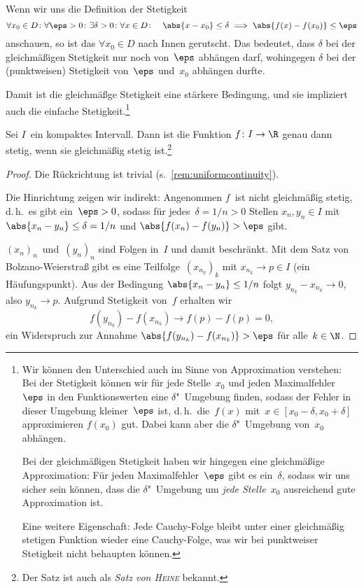 \documentclass[a4paper]{article}
\begin{document}
\begin{remark}\label{rem:uniformcontinuity}
    Wenn wir uns die Definition der Stetigkeit
    \begin{equation*}
        \forall x_0 \in D\colon \forall \eps > 0\colon \exists \delta > 0\colon \forall x \in D\colon\quad \abs{x-x_0} \leq \delta \implies \abs{f(x)-f(x_0)} \leq \eps
    \end{equation*}
    anschauen, so ist das $\forall x_0 \in D$ nach Innen gerutscht. Das bedeutet, dass $\delta$ bei der gleichmäßigen Stetigkeit nur noch von~$\eps$ abhängen darf, wohingegen $\delta$ bei der (punktweisen) Stetigkeit von~$\eps$ und~$x_0$ abhängen durfte.

    Damit ist die gleichmäßge Stetigkeit eine stärkere Bedingung, und sie impliziert auch die einfache Stetigkeit.\footnote{Wir können den Unterschied auch im Sinne von Approximation verstehen: Bei der Stetigkeit können wir für jede Stelle~$x_0$ und jeden Maximalfehler~$\eps$ in den Funktionswerten eine $\delta$"~Umgebung finden, sodass der Fehler in dieser Umgebung kleiner~$\eps$ ist, d.\,h.\ die~$f(x)$ mit~$x \in [x_0-\delta,x_0+\delta]$ approximieren $f(x_0)$ gut. Dabei kann aber die $\delta$"~Umgebung von~$x_0$ abhängen.

        Bei der gleichmäßigen Stetigkeit haben wir hingegen eine gleichmäßige Approximation: Für jeden Maximalfehler~$\eps$ gibt es ein~$\delta$, sodass wir uns sicher sein können, dass die $\delta$"~Umgebung um \emph{jede Stelle~$x_0$} ausreichend gute Approximation ist.

        Eine weitere Eigenschaft: Jede Cauchy-Folge bleibt unter einer gleichmäßig stetigen Funktion wieder eine Cauchy-Folge, was wir bei punktweiser Stetigkeit nicht behaupten können.}
\end{remark}

\begin{theorem}
    Sei $I$~ein kompaktes Intervall. Dann ist die Funktion $f\colon I \to \R$ genau dann stetig, wenn sie gleichmäßig stetig ist.\footnote{Der Satz ist auch als \emph{Satz von \textsc{Heine}} bekannt.}
\end{theorem}

\begin{proof}
    Die Rückrichtung ist trivial (s.~\cref{rem:uniformcontinuity}).

    Die Hinrichtung zeigen wir indirekt: Angenommen $f$~ist nicht gleichmäßig stetig, d.\,h.\ es gibt ein~$\eps > 0$, sodass für jedes~$\delta = 1/n > 0$ Stellen $x_n,y_n \in I$ mit $\abs{x_n-y_n} \leq \delta = 1/n$ und $\abs{f(x_n)-f(y_n)} > \eps$ gibt.

    $(x_n)_n$~und~$(y_n)_n$ sind Folgen in~$I$ und damit beschränkt. Mit dem Satz von Bolzano-Weierstraß gibt es eine Teilfolge~$(x_{n_k})_k$ mit $x_{n_k} \to p \in I$ (ein Häufungspunkt). Aus der Bedingung $\abs{x_n-y_n} \leq 1/n$ folgt $y_{n_k}-x_{n_k} \to 0$, also $y_{n_k} \to p$. Aufgrund Stetigkeit von~$f$ erhalten wir
    \begin{equation*}
        f(y_{n_k}) - f(x_{n_k}) \to f(p) - f(p) = 0,
    \end{equation*}
    ein Widerspruch zur Annahme $\abs{f(y_{n_k})-f(x_{n_k})} > \eps$ für alle~$k \in \N$.
\end{proof}
\end{document}

